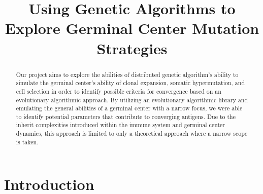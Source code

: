 \documentclass[conference]{IEEEtran}
\begin{document}
\title{Using Genetic Algorithms to Explore Germinal Center Mutation Strategies}

\author{
\and
{}
\and
{}
}

\maketitle

\begin{abstract}


Our project aims to explore the abilities of distributed genetic algorithm's ability to simulate the germinal center's ability of clonal expansion, somatic hypermutation, and cell selection in order to identify possible criteria for convergence based on an evolutionary algorithmic approach. By utilizing an evolutionary algorithmic library and emulating the general abilities of a germinal center with a narrow focus, we were able to identify potential parameters that contribute to converging antigens. Due to the inherit complexities introduced within the immune system and germinal center dynamics, this approach is limited to only a theoretical approach where a narrow scope is taken.    
\end{abstract}


\section{Introduction}
\end{document}
